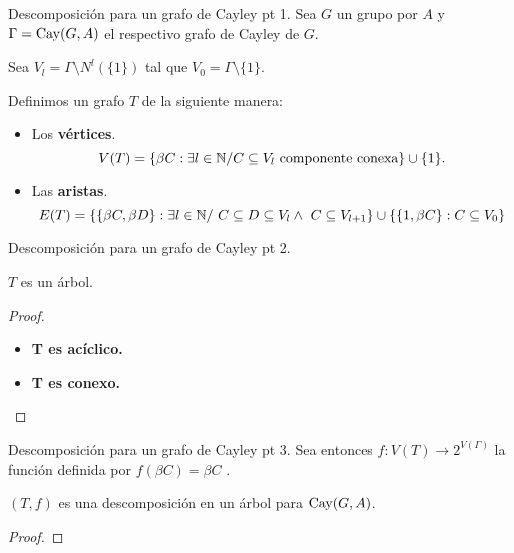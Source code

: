 \documentclass[aspectratio=169, 11pt]{beamer}
\begin{document}
	\begin{frame}[fragile]{Descomposición para un grafo de Cayley pt 1.}
		Sea $G$ un grupo \fg por $A$ y $\Gamma = \text{Cay}(G,A)$ el respectivo grafo de Cayley de $G$.
		
		Sea $V_l = \Gamma \setminus N^l(\{1\}) $ tal que $V_0 = \Gamma \setminus \{1\}$.  	
		
		Definimos un grafo $T$ de la siguiente manera:
		\begin{itemize}
			\item 
				Los \textbf{vértices}.
				\[
				V(T) = \{  \beta C : \exists l \in \mathbb{N} / C \subseteq V_l \ \text{componente conexa} \} \cup \{ 1 \}.
				\]
			
			\item 
				Las \textbf{aristas}.
				\[
				E(T) = \{ \{ \beta C, \beta D \} : \exists l \in \mathbb{N} / \ C \subseteq D \subseteq V_l \land \ C \subseteq V_{l+1}  \} \cup \{  \{1,\beta C\} : C \subseteq V_0  \}
				\]
		\end{itemize}
	\end{frame}

	\begin{frame}[fragile]{Descomposición para un grafo de Cayley pt 2.}
		\begin{prop}
			$T$ es un árbol.
		\end{prop}		
	
		\begin{proof}
			\begin{itemize}
				\item 
				\textbf{T es acíclico.}
				\item 
				\textbf{T es conexo.}
			\end{itemize}
		\end{proof}
	\end{frame}

	\begin{frame}[fragile]{Descomposición para un grafo de Cayley pt 3.}
		Sea entonces $f: V(T) \to 2^{V(\Gamma)}$ la función definida por $f(\beta C) = \beta C$	.
		
		\begin{prop}
			$(T,f)$ es una descomposición en un árbol para $\text{Cay}(G,A)$.
		\end{prop}
		
		\begin{proof}
		\end{proof}
	
	\end{frame}
\end{document}

